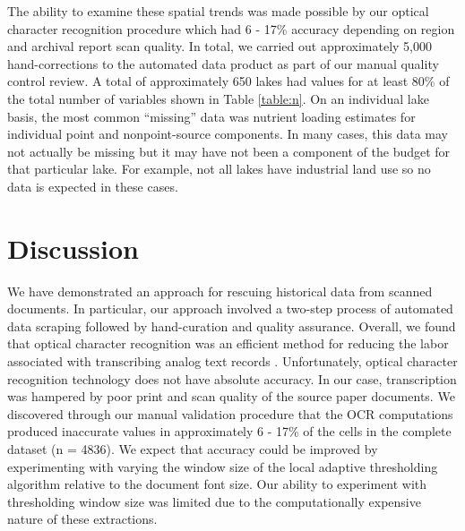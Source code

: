 \documentclass[journal abbreviations, manuscript]{copernicus}
\begin{document}
The ability to examine these spatial trends was made possible by our optical character recognition procedure which had 6 - 17\% accuracy depending on region and archival report scan quality. In total, we carried out approximately 5,000 hand-corrections to the automated data product as part of our manual quality control review. A total of approximately 650 lakes had values for at least 80\% of the total number of variables shown in Table \ref{table:n}. On an individual lake basis, the most common “missing” data was nutrient loading estimates for individual point and nonpoint-source components. In many cases, this data may not actually be missing but it may have not been a component of the budget for that particular lake. For example, not all lakes have industrial land use so no data is expected in these cases.

\section{Discussion}

We have demonstrated an approach for rescuing historical data from scanned documents. In particular, our approach involved a two-step process of automated data scraping followed by hand-curation and quality assurance. Overall, we found that optical character recognition was an efficient method for reducing the labor associated with transcribing analog text records \citep{drinkwater2014use}. Unfortunately, optical character recognition technology does not have absolute accuracy. In our case, transcription was hampered by poor print and scan quality of the source paper documents. We discovered through our manual validation procedure that the OCR computations produced inaccurate values in approximately 6 - 17\% of the cells in the complete dataset (n = 4836). We expect that accuracy could be improved by experimenting with varying the window size of the local adaptive thresholding algorithm relative to the document font size. Our ability to experiment with thresholding window size was limited due to the computationally expensive nature of these extractions.
\end{document}
